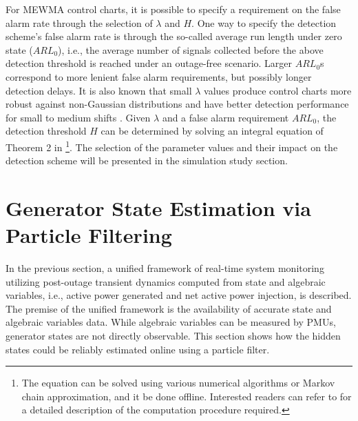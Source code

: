 For MEWMA control charts, it is possible to specify a requirement on the false alarm rate through the selection of $\lambda$ and $H$. One way to specify the detection scheme's false alarm rate is through the so-called average run length under zero state ($ARL_0$), i.e., the average number of signals collected before the above detection threshold is reached under an outage-free scenario. Larger $ARL_0$s correspond to more lenient false alarm requirements, but possibly longer detection delays. It is also known that small $\lambda$ values produce control charts more robust against non-Gaussian distributions and have better detection performance for small to medium shifts \cite{montgomery2007introduction}. Given $\lambda$ and a false alarm requirement $ARL_0$, the detection threshold $H$ can be determined by solving an integral equation of Theorem 2 in \cite{rigdon1995integral}\footnote{The equation can be solved using various numerical algorithms or Markov chain approximation, and it be done offline. Interested readers can refer to \cite{knoth2017arl} for a detailed description of the computation procedure required.}. The selection of the parameter values and their impact on the detection scheme will be presented in the simulation study section. 



\section{Generator State Estimation via Particle Filtering}
\label{ch4:sec:state_estimation}
In the previous section, a unified framework of real-time system monitoring utilizing post-outage transient dynamics computed from state and algebraic variables, i.e., active power generated and net active power injection, is described. The premise of the unified framework is the availability of accurate state and algebraic variables data. While algebraic variables can be measured by PMUs, generator states are not directly observable. This section shows how the hidden states could be reliably estimated online using a particle filter.


